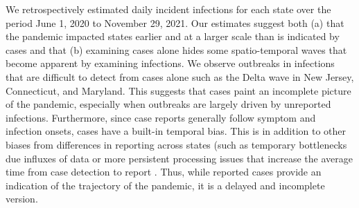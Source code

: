 \documentclass{article}
\begin{document}
We retrospectively estimated daily incident infections for each \US state over
the period June 1, 2020 to November 29, 2021. Our  estimates suggest both (a)
that the pandemic impacted states earlier and at a larger scale than is
indicated by cases and that (b) examining cases alone hides some spatio-temporal
waves that become apparent by examining infections. We observe outbreaks in
infections that are difficult to detect from cases alone such as the Delta wave
in New Jersey, Connecticut, and Maryland. This suggests that cases paint an
incomplete picture of the pandemic, especially when outbreaks are largely driven
by unreported infections. Furthermore, since case reports generally follow
symptom and infection onsets, cases have a built-in temporal bias. This is in addition
to other biases from differences in reporting across states (such as temporary
bottlenecks due influxes of data or more persistent processing issues that
increase the average time from case detection to report \citep{wash2020dash,
dunkel2020covid19}. 
Thus, while reported cases provide an indication of the trajectory of the
pandemic, it is a delayed and incomplete version.


\end{document}
